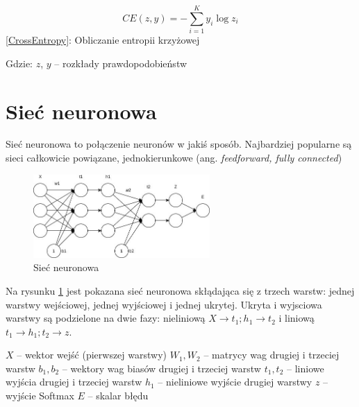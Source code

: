 \documentclass{article}
\begin{document}
\begin{center}
	\begin{equation}	
		CE(z, y) = -\sum_{i=1}^{K}y_i \log z_i
		\label{CrossEntropy}
	\end{equation}
	\ref{CrossEntropy}: Obliczanie entropii krzyżowej
\end{center} 

\begin{flushleft}
	Gdzie:\newline
	$z$, $y$ -- rozkłady prawdopodobieństw
\end{flushleft}

\section{Sieć neuronowa}
Sieć neuronowa to połączenie neuronów w jakiś sposób. Najbardziej popularne są sieci całkowicie powiązane, jednokierunkowe (ang. \textit{feedforward, fully connected})

\begin{figure}[H]
	\centering
	\includegraphics[width=0.6\textwidth,keepaspectratio=true]{feed_forward_network}
	\caption{
		Sieć neuronowa  
	}
	\label{feed_forward_network}
\end{figure}

Na rysunku \ref{feed_forward_network} jest pokazana sieć neuronowa skłądająca się z trzech warstw: jednej warstwy wejściowej, jednej wyjściowej i jednej ukrytej. Ukryta i wyjsciowa warstwy są podzielone na dwie fazy: nieliniową $X \rightarrow t_1; h_1 \rightarrow t_2$ i liniową $t_1 \rightarrow h_1; t_2 \rightarrow z$.

\begin{flushleft}
	$X$ -- wektor wejść (pierwszej warstwy) \newline
	$W_1, W_2$ -- matrycy wag drugiej i trzeciej warstw \newline
	$b_1, b_2$ -- wektory wag biasów drugiej i trzeciej warstw \newline
	$t_1, t_2$ -- liniowe wyjścia drugiej i trzeciej warstw \newline
	$h_1$ -- nieliniowe wyjście drugiej warstwy \newline
	$z$ -- wyjście Softmax \newline
	$E$ -- skalar błędu
\end{flushleft}
\end{document}
